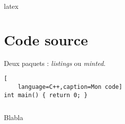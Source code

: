 \documentclass{article}
\begin{document}
\begin{multicols*}{3}
\begin{latexcode}
    \usepackage{glossaries}
    \makeglossaries
    \gls{latex}          %
    \printglossaries     %
\end{latexcode}

\section*{Code source}
Deux paquets : \emph{listings} ou \emph{minted}.
\begin{multicols*}{2}
\begin{latexcode}
\usepackage{listings}

\begin{lstlisting}[
    language=C++,caption=Mon code]
int main() { return 0; }
\end{lstlisting}
\end{latexcode}
\columnbreak
\begin{latexcode}
\usepackage{minted} %
\begin{listing}[h]
  \inputminted{python}{code.py}
  \caption{Blabla \label{py:code}}
\end{listing}
\end{latexcode}
\end{multicols*}



\end{multicols*}
\end{document}

